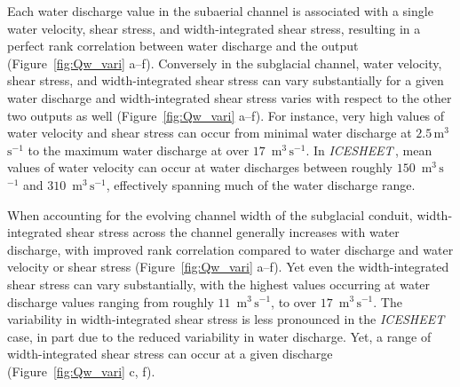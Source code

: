 \documentclass[11pt]{article}
\newcommand{\icesheet}{\textit{ICESHEET}\,}
\newcommand{\unit}[1]{$\mathrm{#1}$}
\begin{document}
Each water discharge value in the subaerial channel is associated with a single water velocity, shear stress, and width-integrated shear stress, resulting in a perfect rank correlation between water discharge and the output (Figure~\ref{fig:Qw_vari} a--f).
Conversely in the subglacial channel,  water velocity, shear stress, and width-integrated shear stress can vary substantially for a given water discharge and width-integrated shear stress varies with respect to the other two  outputs as well (Figure~\ref{fig:Qw_vari} a--f).
For instance, very high values of water velocity and shear stress can occur from minimal water discharge at $2.5$\,\unit{m}$^3$\,\unit{s}$^{-1}$ to the maximum water discharge at over $17$ \,\unit{m}$^3$\,\unit{s}$^{-1}$.
In \icesheet, mean values of water velocity can occur at water discharges between roughly $150$ \,\unit{m}$^3$\,\unit{s}$^{-1}$ and $310$ \,\unit{m}$^3$\,\unit{s}$^{-1}$, effectively spanning much of the water discharge range.

When accounting for the evolving channel width of the subglacial conduit, width-integrated shear stress  across the channel generally increases with water discharge, with improved rank correlation compared to water discharge and water velocity or shear stress (Figure~\ref{fig:Qw_vari} a--f).
Yet even the width-integrated shear stress  can vary substantially, with the highest values occurring at water discharge values ranging from roughly $11$ \,\unit{m}$^3$\,\unit{s}$^{-1}$, to over $17$ \,\unit{m}$^3$\,\unit{s}$^{-1}$.
The variability in width-integrated shear stress is less pronounced in the \icesheet case, in part due to the reduced variability in water discharge.
Yet, a range of width-integrated shear stress can occur at a given discharge (Figure~\ref{fig:Qw_vari} c, f).
\end{document}
